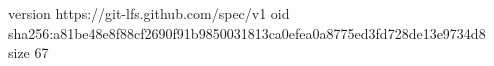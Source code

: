 version https://git-lfs.github.com/spec/v1
oid sha256:a81be48e8f88cf2690f91b9850031813ca0efea0a8775ed3fd728de13e9734d8
size 67
